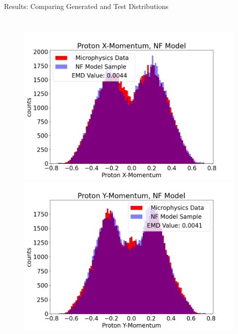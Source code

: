 \documentclass[aspectratio=169]{beamer}
\begin{document}
\begin{frame}{Results: Comparing Generated and Test Distributions}
\begin{columns}
             \begin{figure}[H]
            \centering
            \includegraphics[width=.97\textwidth]{images/Features16/Proton_X-Momentum,_NF_Model.png}
            \includegraphics[width=.97\textwidth]{images/Features16/Proton_Y-Momentum,_NF_Model.png}
            \end{figure}
    \end{columns}
\end{frame}
\end{document}
